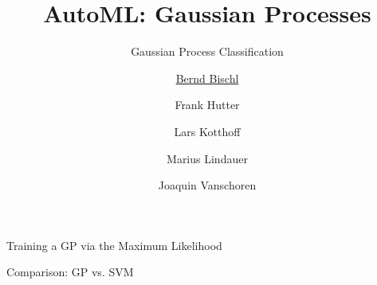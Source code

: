 



\newcommand{\lz}{\vspace{0.5cm}}
\newcommand{\thetab}{\bm{\weights}}
\newcommand{\zero}{\mathbf{0}}
\newcommand{\Xmat}{\mathbf{X}}
\newcommand{\ydat}{\mathbf{y}}
\newcommand{\id}{\boldsymbol{I}}
\newcommand{\Amat}{\mathbf{A}}
\newcommand{\Xspace}{\mathcal{X}}                                           
\newcommand{\Yspace}{\mathcal{Y}}
\newcommand{\ls}{\ell}
\newcommand{\natnum}{\mathbb{N}}
\newcommand{\intnum}{\mathbb{Z}}

\usepackage{fontawesome}
\usepackage{dirtytalk}
\usepackage{csquotes}



\title[AutoML: GPs]{AutoML: Gaussian Processes} %
\subtitle{Gaussian Process Classification} %
\author[Marius Lindauer]{\underline{Bernd Bischl} \and Frank Hutter \and Lars Kotthoff\newline \and Marius Lindauer \and Joaquin Vanschoren}
\institute{}
\date{}





\maketitle



\begin{frame}[c,allowframebreaks]{Training a GP via the Maximum Likelihood}



\framebreak




\framebreak





\framebreak





\end{frame}

\begin{frame}[c,allowframebreaks]{Comparison: GP vs. SVM}






\framebreak





\end{frame}

